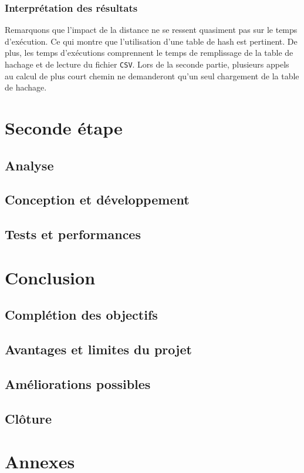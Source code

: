 \documentclass[a4paper, 12pt]{report}
\begin{document}
\subsection{Interprétation des résultats}
Remarquons que l'impact de la distance ne se ressent quasiment pas sur le temps d'exécution. Ce qui montre que l'utilisation d'une table de hash est pertinent. De plus, les temps d'exécutions comprennent le temps de remplissage de la table de hachage et de lecture du fichier \texttt{CSV}. Lors de la seconde partie, plusieurs appels au calcul de plus court chemin ne demanderont qu'un seul chargement de la table de hachage.\par\bigskip

\chapter{Seconde étape}
\minitoc
{}
\clearpage
\section{Analyse}
\section{Conception et développement}
\section{Tests et performances}

\chapter{Conclusion}
\minitoc
{}
\clearpage
\section{Complétion des objectifs}
\section{Avantages et limites du projet}
\section{Améliorations possibles}
\section{Clôture}

\chapter{Annexes}
\minitoc
{}
\clearpage

\appendix
\end{document}
